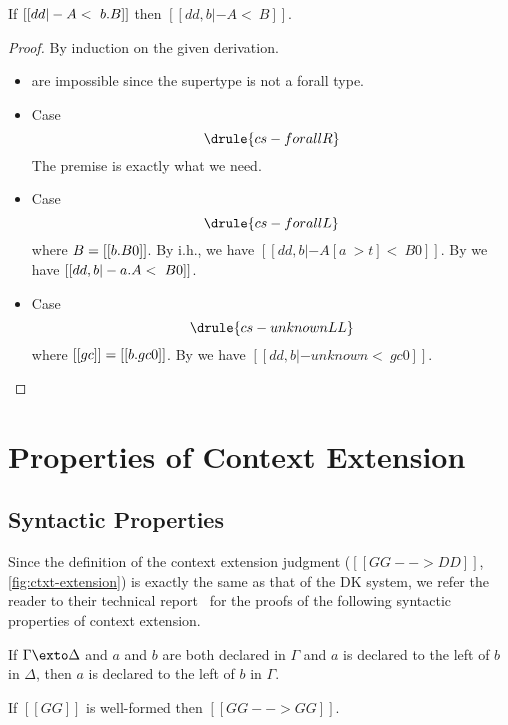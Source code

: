 \begin{lemma}[Invertibility]  \label{lemma:forall_invert}
  If $ [[dd |- A <~ \/b . B]] $ then $[[ dd, b |- A <~ B ]]$.
\end{lemma}
\begin{proof}
  By induction on the given derivation.
  \begin{itemize}
  \item {} are impossible since
    the supertype is not a forall type.
  \item Case \[  \drule{cs-forallR}   \] The premise is exactly what we need.
  \item Case \[  \drule{cs-forallL}  \] where $B = [[  \/b . B0 ]]$. By i.h.,
    we have $[[ dd, b |- A [a ~> t] <~ B0 ]]$. By  we have
    $[[  dd , b |- \/a . A <~ B0 ]]$.
  \item Case \[ \drule{cs-unknownLL}   \] where $[[gc]] = [[\/b . gc0 ]]$. By 
    we have $[[ dd , b |- unknown <~ gc0 ]]$.
  \end{itemize}
\end{proof}


\newpage


\section{Properties of Context Extension}

\subsection{Syntactic Properties}


Since the definition of the context extension judgment ($[[GG --> DD]]$,
\cref{fig:ctxt-extension}) is exactly the same as that of the DK system, we
refer the reader to their technical report~\citep{dunfield2013complete} for the proofs of the following
syntactic properties of context extension.



\begin{lemma}   \label{lemma:reverse_preserve}
  If $\Gamma \exto \Delta$ and $a$ and $b$ are both declared in $\Gamma$ and $a$
  is declared to the left of $b$ in $\Delta$, then $a$ is declared to the left
  of $b$ in $\Gamma$.
\end{lemma}



\begin{lemma}[Reflexivity]   \label{lemma:reflexivity}
  If $[[GG]]$ is well-formed then $[[GG --> GG]]$.
\end{lemma}


